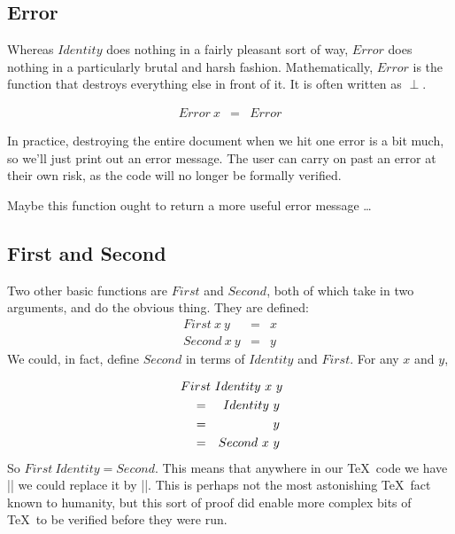 \subsection{Error}

Whereas $Identity$ does nothing in a fairly pleasant sort of way,
$Error$ does nothing in a particularly brutal and harsh fashion.
Mathematically, $Error$ is the function that destroys everything
else in front of it.  It is often written as $\perp$.

\begin{eqnarray*}
   Error~x  &  =  &  Error
\end{eqnarray*}

In practice, destroying the entire document when we hit one error
is a bit much, so we'll just print out an error message.
The user can carry on past an error at their own risk, as the code
will no longer be formally verified.

Maybe this function ought to return a more useful error message \ldots

\subsection{First and Second}

Two other basic functions are $First$ and $Second$, both of which
take in two arguments, and do the obvious thing.  They are defined:
\begin{eqnarray*}
    First~x~y  &  =  &  x  \\
   Second~x~y  &  =  &  y
\end{eqnarray*}
We could, in
fact, define $Second$ in terms of $Identity$ and $First$.  
For any $x$ and $y$,


\def\start#1{\lefteqn{#1}\quad\\}

\begin{eqnarray*}
   \start{First~Identity~x~y}  
   &  =  &  Identity~y  \\
   &  =  &  y  \\
   &  =  &  Second~x~y
\end{eqnarray*}
So $First~Identity = Second$.  This means that anywhere in our \TeX\ code
we have |\First\Identity| we could replace it by |\Second|.
This is perhaps not the most astonishing \TeX\ fact known to humanity,
but this sort of proof did enable more complex bits of \TeX\ to be
verified before they were run.

